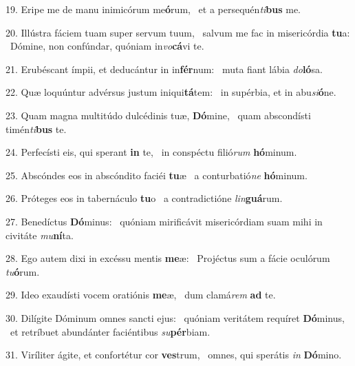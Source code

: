 19. Eripe me de manu inimicórum me\textbf{ó}rum, \ast\  et a persequén\textit{ti}\textbf{bus} me.\

20. Illústra fáciem tuam super servum tuum, \dag\  salvum me fac in misericórdia \textbf{tu}a: \ast\  Dómine, non confúndar, quóniam in\textit{vo}\textbf{cá}vi te.\

21. Erubéscant ímpii, et deducántur in in\textbf{fér}num: \ast\  muta fiant lábia \textit{do}\textbf{ló}sa.\

22. Quæ loquúntur advérsus justum iniqui\textbf{tá}tem: \ast\  in supérbia, et in abu\textit{si}\textbf{ó}ne.\

23. Quam magna multitúdo dulcédinis tuæ, \textbf{Dó}mine, \ast\  quam abscondísti timén\textit{ti}\textbf{bus} te.\

24. Perfecísti eis, qui sperant \textbf{in} te, \ast\  in conspéctu filió\textit{rum} \textbf{hó}minum.\

25. Abscóndes eos in abscóndito faciéi \textbf{tu}æ \ast\  a conturbatió\textit{ne} \textbf{hó}minum.\

26. Próteges eos in tabernáculo \textbf{tu}o \ast\  a contradictióne \textit{lin}\textbf{guá}rum.\

27. Benedíctus \textbf{Dó}minus: \ast\  quóniam mirificávit misericórdiam suam mihi in civitáte \textit{mu}\textbf{ní}ta.\

28. Ego autem dixi in excéssu mentis \textbf{me}æ: \ast\  Projéctus sum a fácie oculórum \textit{tu}\textbf{ó}rum.\

29. Ideo exaudísti vocem oratiónis \textbf{me}æ, \ast\  dum clamá\textit{rem} \textbf{ad} te.\

30. Dilígite Dóminum omnes sancti ejus: \dag\  quóniam veritátem requíret \textbf{Dó}minus, \ast\  et retríbuet abundánter faciéntibus \textit{su}\textbf{pér}biam.\

31. Viríliter ágite, et confortétur cor \textbf{ves}trum, \ast\  omnes, qui sperátis \textit{in} \textbf{Dó}mino.\


